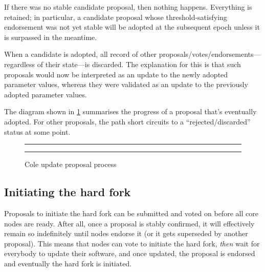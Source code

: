 \begin{enumerate}
If there was no stable candidate proposal, then nothing happens. Everything is
retained; in particular, a candidate proposal whose threshold-satisfying
endorsement was not yet stable will be adopted at the subsequent epoch unless it
is surpassed in the meantime.

When a candidate is adopted, all record of other
proposals/votes/endorsements---regardless of their state---is discarded. The
explanation for this is that such proposals would now be interpreted as an
update to the newly adopted parameter values, whereas they were validated as an
update to the previously adopted parameter values.

\end{enumerate}

The diagram shown in \cref{cole:update-process} summarises the progress of a
proposal that's eventually adopted. For other proposals, the path short circuits
to a ``rejected/discarded'' status at some point.

\begin{figure}
\hrule
\begin{center}
\end{center}
\hrule
\caption{\label{cole:update-process}Cole update proposal process}
\end{figure}

\subsection{Initiating the hard fork}
\label{cole:hardfork:initiating}

Proposals to initiate the hard fork can be submitted and voted on before all
core nodes are ready. After all, once a proposal is stably confirmed, it will
effectively remain so indefinitely until nodes endorse it (or it gets superseded
by another proposal). This means that nodes can vote to initiate the hard fork,
\emph{then} wait for everybody to update their software, and once updated, the
proposal is endorsed and eventually the hard fork is initiated.

